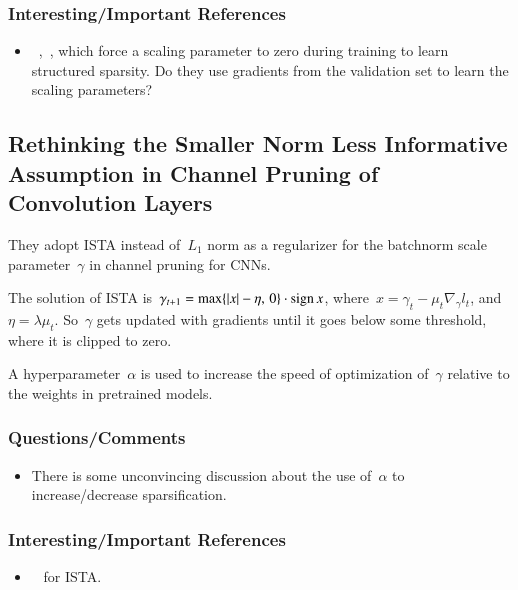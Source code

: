 \documentclass[a4paper, 12pt]{article}
\DeclareMathOperator{\sign}{sign}
\DeclarePairedDelimiter\abs{\lvert}{\rvert}%
\begin{document}
\subsubsection{Interesting/Important References}

\begin{itemize}
        \item~\cite{huang2018datadriven},~\cite{ye2018rethinking}, which force
                a scaling parameter to zero during training to learn structured
                sparsity. Do they use gradients from the validation set to
                learn the scaling parameters?
\end{itemize}


\subsection{Rethinking the Smaller Norm Less Informative Assumption in Channel
            Pruning of Convolution Layers~\cite{ye2018rethinking}}

They adopt ISTA instead of~$L_1$ norm as a regularizer for the batchnorm scale
parameter~$\gamma$ in channel pruning for CNNs.

The solution of ISTA
is~$\gamma_{t + 1} = \max\{\abs{x} - \eta,\, 0\} \cdot \sign{x}$,
where~$x = \gamma_t - \mu_t \nabla_\gamma l_t$, and~$\eta = \lambda \mu_t$.
So~$\gamma$ gets updated with gradients until it goes below some threshold,
where it is clipped to zero.

A hyperparameter~$\alpha$ is used to increase the speed of optimization
of~$\gamma$ relative to the weights in pretrained models.

\subsubsection{Questions/Comments}

\begin{itemize}
        \item There is some unconvincing discussion about the use of~$\alpha$
                to increase/decrease sparsification.
\end{itemize}

\subsubsection{Interesting/Important References}

\begin{itemize}
        \item~\cite{beck2009afast} for ISTA.
\end{itemize}
\end{document}
